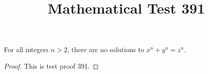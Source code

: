\documentclass{amsart}
\begin{document}
\title{Mathematical Test 391}
\begin{theorem}
For all integers $n > 2$, there are no solutions to $x^n + y^n = z^n$.
\end{theorem}
\begin{proof}
This is test proof 391.
\end{proof}
\end{document}
